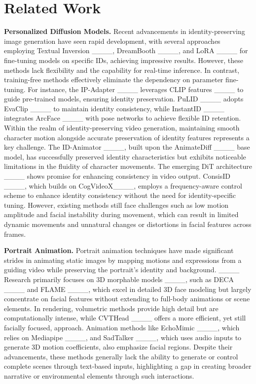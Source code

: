 \section{Related Work}
\textbf{Personalized Diffusion Models.} Recent advancements in identity-preserving image generation have seen rapid development, with several approaches employing Textual Inversion ____, DreamBooth ____, and LoRA ____ for fine-tuning models on specific IDs, achieving impressive results. However, these methods lack flexibility and the capability for real-time inference. In contrast, training-free methods effectively eliminate the dependency on parameter fine-tuning. For instance, the IP-Adapter ____ leverages CLIP features ____ to guide pre-trained models, ensuring identity preservation. PuLID ____ adopts EvaClip ____ to maintain identity consistency, while InstantID ____ integrates ArcFace ____ with pose networks to achieve flexible ID retention. Within the realm of identity-preserving video generation, maintaining smooth character motion alongside accurate preservation of identity features represents a key challenge. The ID-Animator ____, built upon the AnimateDiff ____ base model, has successfully preserved identity characteristics but exhibits noticeable limitations in the fluidity of character movements. The emerging DiT architecture ____ shows promise for enhancing consistency in video output. ConsisID ____, which builds on CogVideoX____, employs a frequency-aware control scheme to enhance identity consistency without the need for identity-specific tuning. However, existing methods still face challenges such as low motion amplitude and facial instability during movement, which can result in limited dynamic movements and unnatural changes or distortions in facial features across frames.

\noindent \textbf{Portrait Animation.} Portrait animation techniques have made significant strides in animating static images by mapping motions and expressions from a guiding video while preserving the portrait's identity and background. ____ Research primarily focuses on 3D morphable models ____, such as DECA ____ and FLAME ____, which excel in detailed 3D face modeling but largely concentrate on facial features without extending to full-body animations or scene elements. In rendering, volumetric methods provide high detail but are computationally intense, while CVTHead ____ offers a more efficient, yet still facially focused, approach. Animation methods like EchoMimic ____, which relies on Mediapipe ____, and SadTalker ____, which uses audio inputs to generate 3D motion coefficients, also emphasize facial regions. Despite their advancements, these methods generally lack the ability to generate or control complete scenes through text-based inputs, highlighting a gap in creating broader narrative or environmental elements through such interactions.